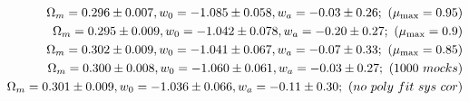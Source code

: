 \documentclass[useAMS,usenatbib]{mnras}
\begin{document}
\begin{eqnarray}
\Omega_m = 0.296 \pm 0.007, w_0 = -1.085 \pm 0.058, w_a = -0.03 \pm 0.26;\ (\mu_{\rm max}=0.95)\\
\Omega_m = 0.295 \pm 0.009, w_0 = -1.042 \pm 0.078, w_a = -0.20 \pm 0.27;\ (\mu_{\rm max}=0.9)\\
\Omega_m = 0.302 \pm 0.009, w_0 = -1.041 \pm 0.067, w_a = -0.07 \pm 0.33;\ (\mu_{\rm max}=0.85)\\
\Omega_m = 0.300 \pm 0.008, w_0 = -1.060 \pm 0.061, w_a = -0.03 \pm 0.27;\ (1000\ mocks)\\
\Omega_m = 0.301 \pm 0.009, w_0 = -1.036 \pm 0.066, w_a = -0.11 \pm 0.30;\ (no\ poly\ fit\ sys\ cor)\\

\end{eqnarray}
\end{document}
